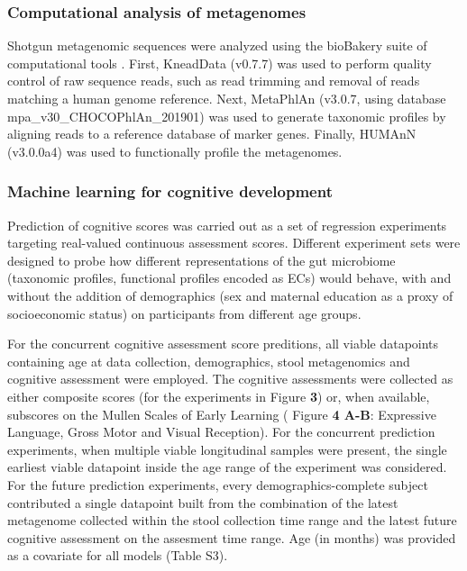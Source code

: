 \documentclass{article}
\begin{document}
\subsubsection*{Computational analysis of metagenomes}

Shotgun metagenomic sequences were analyzed using the bioBakery suite of
computational tools \cite{beghiniIntegratingTaxonomicFunctional2021}.
First, KneadData (v0.7.7) was used to perform quality
control of raw sequence reads, such as read trimming and removal of
reads matching a human genome reference. Next, MetaPhlAn (v3.0.7, using
database mpa\_v30\_CHOCOPhlAn\_201901) was used to generate taxonomic
profiles by aligning reads to a reference database of marker genes.
Finally, HUMAnN (v3.0.0a4) was used to functionally profile the
metagenomes.

\subsubsection*{Machine learning for cognitive development}

Prediction of cognitive scores was carried out as a set of regression
experiments targeting real-valued continuous assessment scores.
Different experiment sets were designed to probe how different
representations of the gut microbiome (taxonomic profiles, functional
profiles encoded as ECs) would behave, with and without the addition of
demographics (sex and maternal education as a proxy of socioeconomic
status) on participants from different age groups.

For the concurrent cognitive assessment score preditions,
all viable datapoints containing 
age at data collection, demographics, stool metagenomics and cognitive assessment were employed.
The cognitive assessments were collected as either composite scores
(for the experiments in Figure \textbf{3}) or, when available, subscores on the
Mullen Scales of Early Learning ( Figure \textbf{4 A-B}: Expressive Language, Gross Motor and Visual Reception).
For the concurrent prediction experiments, when multiple viable longitudinal samples were present,
the single earliest viable datapoint inside the age range of the experiment was considered.
For the future prediction experiments, every demographics-complete subject
contributed a single datapoint built from the combination of
the latest metagenome collected within the stool collection time range and
the latest future cognitive assessment on the assesment time range.
Age (in months) was provided as a covariate for all models (Table S3).
\end{document}
